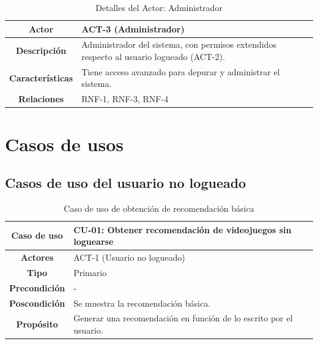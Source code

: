 \vspace{0.5cm}

\begin{table}[H]
\centering
\begin{tabular}{|c|p{10cm}|}
\hline
\rowcolor{green!40} \textbf{Actor} & ACT-3 (Administrador)\\ \hline
\rowcolor{blue!10} \textbf{Descripción} & Administrador del sistema, con permisos extendidos respecto al usuario logueado (ACT-2).\\ \hline
\rowcolor{blue!10} \textbf{Características} & Tiene acceso avanzado para depurar y administrar el sistema.\\ \hline
\rowcolor{blue!10} \textbf{Relaciones} & RNF-1, RNF-3, RNF-4\\ \hline
\end{tabular}
\caption{Detalles del Actor: Administrador}
\end{table}




\newpage
\section{Casos de usos}

\subsection{Casos de uso del usuario no logueado}

\begin{table}[H]
\centering
\begin{tabular}{|c|p{10cm}|}
\hline
\rowcolor{green!40} \textbf{Caso de uso} & CU-01: Obtener recomendación de videojuegos sin loguearse \\ \hline
\rowcolor{blue!10} \textbf{Actores} & ACT-1 (Usuario no logueado) \\ \hline
\rowcolor{blue!10} \textbf{Tipo} & Primario \\ \hline
\rowcolor{blue!10} \textbf{Precondición} & - \\ \hline
\rowcolor{blue!10} \textbf{Poscondición} & Se muestra la recomendación básica. \\ \hline
\rowcolor{blue!10} \textbf{Propósito} & Generar una recomendación en función de lo escrito por el usuario. \\ \hline
\end{tabular}
\caption{Caso de uso de obtención de recomendación básica}
\end{table}

